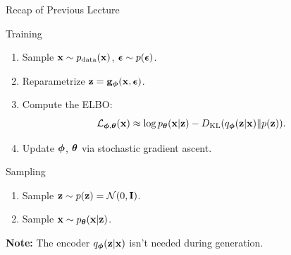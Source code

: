 \documentclass{beamer}
\begin{document}
\begin{frame}
	\titlepage
	\resetonslide
\end{frame}
\begin{frame}{Recap of Previous Lecture}
	\begin{block}{Training}
		\begin{enumerate}
			\item Sample $\mathbf{x} \sim p_{\text{data}}(\mathbf{x})$, $\boldsymbol{\epsilon} \sim p(\boldsymbol{\epsilon})$.
			\item Reparametrize $\mathbf{z} = \mathbf{g}_{\boldsymbol{\phi}}(\mathbf{x}, \boldsymbol{\epsilon})$.
			\item Compute the ELBO:
			\vspace{-0.3cm}
			\[
				\mathcal{L}_{\boldsymbol{\phi}, \boldsymbol{\theta}}(\mathbf{x}) \approx \log p_{\boldsymbol{\theta}}(\mathbf{x} | \mathbf{z}) - D_\mathrm{KL}(q_{\boldsymbol{\phi}}(\mathbf{z}| \mathbf{x}) \| p(\mathbf{z})).
			\]
			\vspace{-0.5cm}
			\item Update $\boldsymbol{\phi}$, $\boldsymbol{\theta}$ via stochastic gradient ascent.
		\end{enumerate}
	\end{block}
	\begin{block}{Sampling}
		\begin{enumerate}
			\item Sample $\mathbf{z} \sim p(\mathbf{z}) = \mathcal{N}(0, \mathbf{I})$.
			\item Sample $\mathbf{x} \sim p_{\boldsymbol{\theta}}(\mathbf{x} | \mathbf{z})$.
		\end{enumerate}
	\end{block}
	\textbf{Note:} The encoder $q_{\boldsymbol{\phi}}(\mathbf{z}| \mathbf{x})$ isn't needed during generation.
\end{frame}
\end{document}
